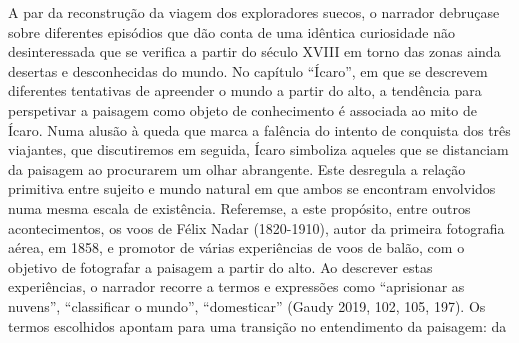\documentclass{article}
\begin{document}
A par da reconstrução da viagem dos exploradores suecos, o narrador debruçase sobre diferentes episódios que dão conta de uma idêntica curiosidade não desinteressada que se verifica a partir do século XVIII em torno das zonas ainda desertas e
desconhecidas do mundo. No capítulo “Ícaro”, em que se descrevem diferentes tentativas de apreender o mundo a partir do alto, a tendência para perspetivar a paisagem
como objeto de conhecimento é associada ao mito de Ícaro. Numa alusão à queda que
marca a falência do intento de conquista dos três viajantes, que discutiremos em
seguida, Ícaro simboliza aqueles que se distanciam da paisagem ao procurarem um
olhar abrangente. Este desregula a relação primitiva entre sujeito e mundo natural
em que ambos se encontram envolvidos numa mesma escala de existência. Referemse, a este propósito, entre outros acontecimentos, os voos de Félix Nadar (1820-1910),
autor da primeira fotografia aérea, em 1858, e promotor de várias experiências de
voos de balão, com o objetivo de fotografar a paisagem a partir do alto. Ao descrever
estas experiências, o narrador recorre a termos e expressões como “aprisionar as nuvens”, “classificar o mundo”, “domesticar” (Gaudy 2019, 102, 105, 197). Os termos
escolhidos apontam para uma transição no entendimento da paisagem: da
\end{document}
